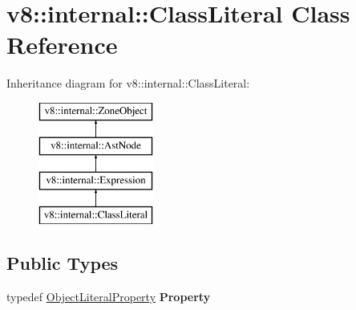 \hypertarget{classv8_1_1internal_1_1_class_literal}{}\section{v8\+:\+:internal\+:\+:Class\+Literal Class Reference}
\label{classv8_1_1internal_1_1_class_literal}
Inheritance diagram for v8\+:\+:internal\+:\+:Class\+Literal\+:\begin{figure}[H]
\begin{center}
\leavevmode
\includegraphics[height=4.000000cm]{classv8_1_1internal_1_1_class_literal}
\end{center}
\end{figure}
\subsection*{Public Types}
\begin{DoxyCompactItemize}
\item 
typedef \hyperlink{classv8_1_1internal_1_1_object_literal_property}{Object\+Literal\+Property} {\bfseries Property}\hypertarget{classv8_1_1internal_1_1_class_literal_a25d74e15086b519b9940d87db81763ae}{}\label{classv8_1_1internal_1_1_class_literal_a25d74e15086b519b9940d87db81763ae}

\end{DoxyCompactItemize}

